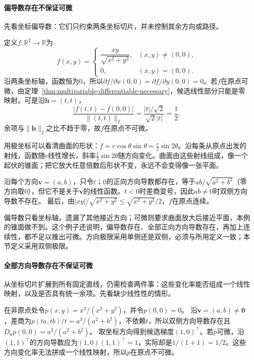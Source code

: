 \paragraph{偏导数存在不保证可微}
先看坐标偏导数：它们只约束两条坐标切片，并未控制其余方向或路径。
\begin{example}[偏导数存在但不可微]
\label{ex:analysis-partials-not-differentiable}
定义$f:\mathbb{R}^2\to\mathbb{R}$为
\[
 f(x,y)=
 \begin{cases}
  \dfrac{xy}{\sqrt{x^2+y^2}}, & (x,y)\neq(0,0),\\[6pt]
  0, & (x,y)=(0,0).
 \end{cases}
\]
沿两条坐标轴，函数恒为$0$，所以$\partial f/\partial x(0,0)=\partial f/\partial y(0,0)=0$。若$f$在原点可微，由定理~\ref{thm:multivariable-differentiable-necessary}，候选线性部分只能是零映射。可是沿$\bm{h}=(t,t)$，
\[
 \frac{|f(t,t)-f(0,0)|}{\lVert(t,t)\rVert_2}
 =\frac{|t|/\sqrt{2}}{\sqrt{2}|t|}
 =\frac12,
\]
余项与$\lVert\bm{h}\rVert_2$之比不趋于零，故$f$在原点不可微。

用极坐标可以看清曲面的形状：$f=r\cos\theta\sin\theta=\tfrac r2\sin2\theta$。沿每条从原点出发的射线，函数随$r$线性增长，斜率$\tfrac12\sin2\theta$随方向变化。曲面由这些射线组成，像一个起伏的锥面；把它放大任意倍数后形状不变，永远不会变得像一张平面。

沿每个方向$\bm v=(a,b)$，只令$t\downarrow0$的正向方向导数都存在，等于$ab/\sqrt{a^2+b^2}$（零方向取$0$），但它不是关于$\bm v$的线性函数。$t<0$时差商变号，因此$ab\neq0$时双侧方向导数不存在。
最后，由$|xy|/\sqrt{x^2+y^2}\leq\sqrt{x^2+y^2}/2$，$f$在原点连续。
\end{example}

偏导数只看坐标轴，遗漏了其他接近方向；可微则要求曲面放大后接近平面，本例的锥面做不到。这个例子还说明，偏导数存在、全部正向方向导数存在，再加上连续性，都不足以推出可微。方向极限采用单侧还是双侧，必须与所用定义一致；本节定义采用双侧极限。

\paragraph{全部方向导数存在不保证可微}
从坐标切片扩展到所有固定直线，仍需检查两件事：这些变化率能否组成一个线性映射，以及是否具有统一余项。先看缺少线性性的情形。
\begin{example}[方向导数不构成线性映射]
\label{ex:multivariable-nonlinear-directional-derivatives}
在非原点处令$p(x,y)=x^3/(x^2+y^2)$，并令$p(0,0)=0$。
沿$\bm v=(a,b)\neq\bm0$，差商为$p(ta,tb)/t=a^3/(a^2+b^2)$，不依赖$t$，所以双侧方向导数存在且$D_{\bm v}p(0,0)=a^3/(a^2+b^2)$。
取坐标方向得到候选梯度$(1,0)^\top$。若$p$可微，沿$(1,1)^\top$的方向导数应为$(1,0)(1,1)^\top=1$，实际却是$1/(1+1)=1/2$。这些方向变化率无法拼成一个线性映射，所以$p$在原点不可微。
\end{example}

